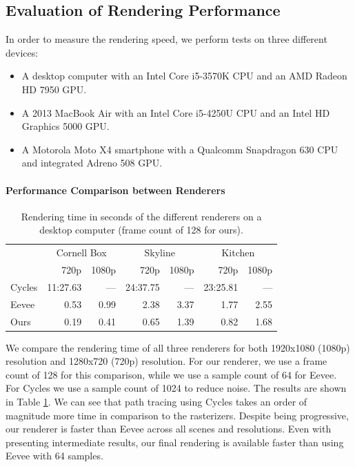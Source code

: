 \documentclass[sigconf,authorversion]{acmart}
\begin{document}
\subsection{Evaluation of Rendering Performance}
In order to measure the rendering speed, we perform tests on three different devices:
\begin{itemize}
    \item A desktop computer with an Intel Core i5-3570K CPU and an AMD Radeon HD 7950 GPU.
    \item A 2013 MacBook Air with an Intel Core i5-4250U CPU and an Intel HD Graphics 5000 GPU.
    \item A Motorola Moto X4 smartphone with a Qualcomm Snapdragon 630 CPU and integrated Adreno 508 GPU.
\end{itemize}

\paragraph{Performance Comparison between Renderers}
\begin{table}[h]
    \centering
    \caption{Rendering time in seconds of the different renderers on a desktop computer (frame count of 128 for ours).}
    \begin{tabular}{l|*{6}{r}}
        & \multicolumn{2}{c}{Cornell Box} & \multicolumn{2}{c}{Skyline} & \multicolumn{2}{c}{Kitchen}\\
        & 720p & 1080p & 720p & 1080p & 720p & 1080p\\\hline
        Cycles & 11:27.63 &   --- & 24:37.75 &   --- & 23:25.81 &   --- \\
        Eevee  &     0.53 &  0.99 &     2.38 &  3.37 &     1.77 &  2.55 \\
        Ours   &     0.19 &  0.41 &     0.65 &  1.39 &     0.82 &  1.68 \\
    \end{tabular}
    \label{tab:performance_different_renderers}
\end{table}
We compare the rendering time of all three renderers for both 1920x1080 (1080p) resolution and 1280x720 (720p) resolution.
For our renderer, we use a frame count of 128 for this comparison, while we use a sample count of 64 for Eevee.
For Cycles we use a sample count of 1024 to reduce noise.
The results are shown in Table \ref{tab:performance_different_renderers}.
We can see that path tracing using Cycles takes an order of magnitude more time in comparison to the rasterizers.
Despite being progressive, our renderer is faster than Eevee across all scenes and resolutions.
Even with presenting intermediate results, our final rendering is available faster than using Eevee with 64 samples.
\end{document}

